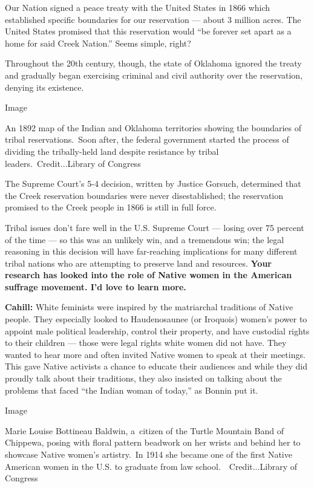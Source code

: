 Our Nation signed a peace treaty with the United States in 1866 which
established specific boundaries for our reservation --- about 3 million
acres. The United States promised that this reservation would ``be
forever set apart as a home for said Creek Nation.'' Seems simple,
right?

Throughout the 20th century, though, the state of Oklahoma ignored the
treaty and gradually began exercising criminal and civil authority over
the reservation, denying its existence.

Image

An 1892 map of the Indian and Oklahoma territories showing the
boundaries of tribal reservations.~Soon after, the federal government
started the process of dividing the tribally-held land despite
resistance by tribal leaders.~Credit...Library of Congress

The Supreme Court's 5-4 decision, written by Justice Gorsuch, determined
that the Creek reservation boundaries were never disestablished; the
reservation promised to the Creek people in 1866 is still in full force.

Tribal issues don't fare well in the U.S. Supreme Court --- losing over
75 percent of the time --- so this was an unlikely win, and a tremendous
win; the legal reasoning in this decision will have far-reaching
implications for many different tribal nations who are attempting to
preserve land and resources. \textbf{Your research has looked into the
role of Native women in the American suffrage movement. I'd love to
learn more.}

\textbf{Cahill:} White feminists were inspired by the matriarchal
traditions of Native people. They especially looked to Haudenosaunee (or
Iroquois) women's power to appoint male political leadership, control
their property, and have custodial rights to their children --- those
were legal rights white women did not have. They wanted to hear more and
often invited Native women to speak at their meetings. This gave Native
activists a chance to educate their audiences and while they did proudly
talk about their traditions, they also insisted on talking about the
problems that faced ``the Indian woman of today,'' as Bonnin put it.

Image

Marie Louise Bottineau Baldwin, a~citizen of the Turtle Mountain Band of
Chippewa, posing with floral pattern beadwork on her wrists and behind
her to showcase Native women's artistry.~In 1914 she became one of the
first Native American women in the U.S. to graduate from law
school.~~Credit...Library of Congress

